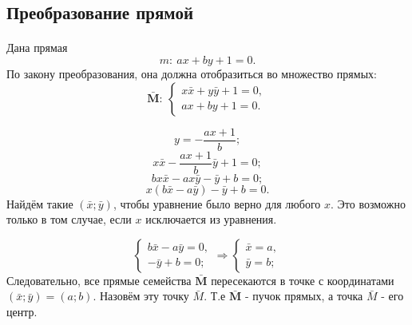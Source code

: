\subsection{Преобразование прямой}
\paragraph{} Дана прямая 
$$m: \: ax + by + 1 = 0.$$
По закону преобразования, она должна отобразиться во множество прямых:
$$\mathbf{\bar{M}}: \:
\left\{
	\begin{array}{l}
		x\bar{x} + y\bar{y} + 1 = 0,\\
		ax + by + 1 = 0.
	\end{array}
\right.
$$

$$y = -\frac{ax+1}{b};$$
$$x\bar{x} -\frac{ax+1}{b}\bar{y} + 1 = 0;$$
$$bx\bar{x} -ax\bar{y} - \bar{y} + b = 0;$$
$$x \left(b\bar{x} - a\bar{y} \right) - \bar{y} + b = 0.$$
Найдём такие $(\bar{x}; \bar{y})$, чтобы уравнение было верно для любого $x$. Это возможно только в том случае, если $x$ исключается из уравнения.

$$
\left\{
	\begin{array}{l}
		b\bar{x} - a\bar{y} = 0,\\
		- \bar{y} + b = 0;
	\end{array}
\right.
\Rightarrow
\left\{
	\begin{array}{l}
		\bar{x} = a,\\
		\bar{y} = b;
	\end{array}
\right.
$$
Следовательно, все прямые семейства $\mathbf{\bar{M}}$ пересекаются в точке с координатами $(\bar{x}; \bar{y}) = (a; b)$. Назовём эту точку $\bar{M}$. Т.е $\mathbf{\bar{M}}$ - пучок прямых, а точка $\bar{M}$ - его центр.